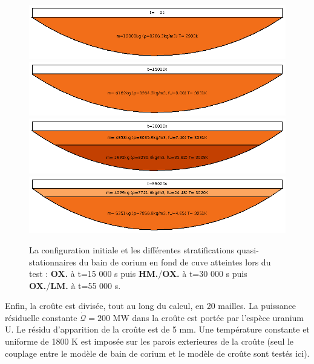 \begin{figure}
\centering
\includegraphics[width=\textwidth, keepaspectratio=true]{Figures/coriumPool_t=00000.png}\\
\includegraphics[width=\textwidth, keepaspectratio=true]{Figures/coriumPool_t=15000.png}\\
\includegraphics[width=\textwidth, keepaspectratio=true]{Figures/coriumPool_t=30000.png}\\
\includegraphics[width=\textwidth, keepaspectratio=true]{Figures/coriumPool_t=55000.png}
\caption{La configuration initiale et les différentes stratifications quasi-stationnaires du bain de corium en fond de cuve atteintes lors du test : \textcolor{orange!75!black}{\textbf{OX.}} à t=15 000 s puis \textcolor{red!50!black}{\textbf{HM.}}/\textcolor{orange!75!black}{\textbf{OX.}} à t=30 000 s puis \textcolor{orange!75!black}{\textbf{OX.}}/\textcolor{orange!50!white}{\textbf{LM.}} à t=55 000 s.}
\label{fig:stratifications_bains}
\end{figure}

Enfin, la croûte est divisée, tout au long du calcul, en 20 mailles. La puissance résiduelle constante $\dot{\mathcal{Q}} = 200$ MW dans la croûte est portée par l'espèce uranium U. Le résidu d'apparition de la croûte est de 5 mm. Une température constante et uniforme de 1800 K est imposée sur les parois exterieures de la croûte (seul le couplage entre le modèle de bain de corium et le modèle de croûte sont testés ici).

